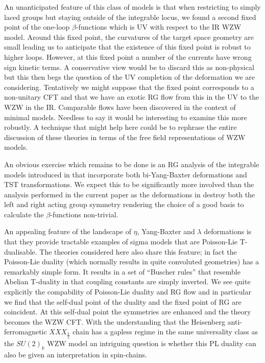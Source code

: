 \documentclass[12pt]{article}
\begin{document}
 
 An unanticipated feature of this class of models is that when restricting to simply laced groups but staying outside of the integrable locus, we found a second fixed point of the one-loop $\beta$-functions which is UV with respect to the IR WZW model.  Around this fixed point, the curvatures of the target space geometry are small leading us to anticipate that the existence of this fixed point is robust to higher loops.  However,  at this fixed point a number of the currents have wrong sign kinetic terms.  A conservative view would be to discard this as non-physical but this then begs the question of the UV completion of the deformation we are considering.  Tentatively we might suppose that the fixed point corresponds to a non-unitary CFT and that we have an exotic RG flow from this in the UV to the WZW in the IR.  Comparable flows have been discovered in the context of minimal models.   Needless to say it would be interesting to examine this more robustly.  A technique that might help here could be to rephrase the entire discussion of these theories in terms of the free field representations of WZW models. 
 
 
An obvious exercise which remains to be done is an RG analysis of the integrable models introduced in \cite{Delduc:2017fib} that incorporate both bi-Yang-Baxter deformations and TST transformations. We expect this to be significantly more involved than the analysis performed in the current paper as the deformations in \cite{Delduc:2017fib} destroy both the left and right acting group symmetry rendering the choice of a good basis to calculate the $\beta $-functions non-trivial. 

An appealing feature of the landscape of $\eta$, Yang-Baxter and $\lambda$ deformations is that they provide tractable examples of sigma models that are Poisson-Lie T-dualisable.  The theories considered here also share this feature; in fact the Poisson-Lie duality (which normally results in quite convoluted geometries) has a remarkably simple form.  It results in a set of ``Buscher rules'' that resemble Abelian T-duality in that coupling constants are simply inverted.  We see quite explicitly the compability of Poisson-Lie duality and RG flow and in particular   we find that the self-dual point of the duality and the fixed point of RG are coincident. At this self-dual point the symmetries are enhanced and the theory becomes the WZW CFT.   With the understanding that the Heisenberg anti-ferromagnetic $XXX_{\frac{k}{2}}$ chain has a gapless regime in the same universality class as the $SU(2)_k$ WZW model \cite{Affleck:1987ch} an intriguing question is whether this PL duality  can also be given an interpretation in spin-chains. 
\end{document}
